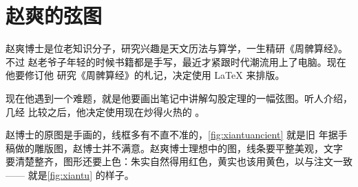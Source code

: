 
\chapter{赵爽的弦图}
\label{chap:xiantu}
\nocite{quanjing}

赵爽博士是位老知识分子，研究兴趣是天文历法与算学，一生精研《周髀算经》。不过
赵老爷子年轻的时候书籍都是手写，最近才紧跟时代潮流用上了电脑。现在他要修订他
研究《周髀算经》的札记，决定使用 \LaTeX{} 来排版。

现在他遇到一个难题，就是他要画出笔记中讲解勾股定理的一幅弦图。听人介绍，几经
比较之后，他决定使用现在炒得火热的 \Asy{}。

赵博士的原图是手画的，线框多有不直不准的，\autoref{fig:xiantuancient} 就是旧
年据手稿做的雕版图，赵博士并不满意。赵爽博士理想中的图，线条要平整美观，文字
要清楚整齐，图形还要上色：朱实自然得用红色，黄实也该用黄色，以与注文一致——
就是\autoref{fig:xiantu} 的样子。

